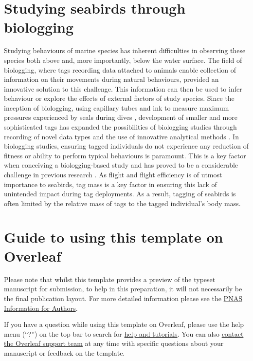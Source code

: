 \documentclass[9pt,twocolumn,twoside,lineno]{pnas-new}
\begin{document}
\section{Studying seabirds through biologging}
Studying behaviours of marine species has inherent difficulties in observing these species both above and, more importantly, below the water surface. The field of biologging, where tags recording data attached to animals enable collection of information on their movements during natural behaviours, provided an innovative solution to this challenge. This information can then be used to infer behaviour or explore the effects of external factors of study species. Since the inception of biologging, using capillary tubes and ink to measure maximum pressures experienced by seals during dives \citep{Kooyman_1965}, development of smaller and more sophisticated tags has expanded the possibilities of biologging studies through recording of novel data types and the use of innovative analytical methods \citep{Kooyman_2004}. In biologging studies, ensuring tagged individuals do not experience any reduction of fitness or ability to perform typical behaviours is paramount. This is a key factor when conceiving a biologging-based study and has proved to be a considerable challenge in previous research \citep{Gessaman_1988, Bowlin_2010}. As flight and flight efficiency is of utmost importance to seabirds, tag mass is a key factor in ensuring this lack of unintended impact during tag deployments. As a result, tagging of seabirds is often limited by the relative mass of tags to the tagged individual's body mass.



\section*{Guide to using this template on Overleaf}

Please note that whilst this template provides a preview of the typeset manuscript for submission, to help in this preparation, it will not necessarily be the final publication layout. For more detailed information please see the \href{https://www.pnas.org/page/authors/format}{PNAS Information for Authors}.

If you have a question while using this template on Overleaf, please use the help menu (``?'') on the top bar to search for \href{https://www.overleaf.com/help}{help and tutorials}. You can also \href{https://www.overleaf.com/contact}{contact the Overleaf support team} at any time with specific questions about your manuscript or feedback on the template.
\end{document}
